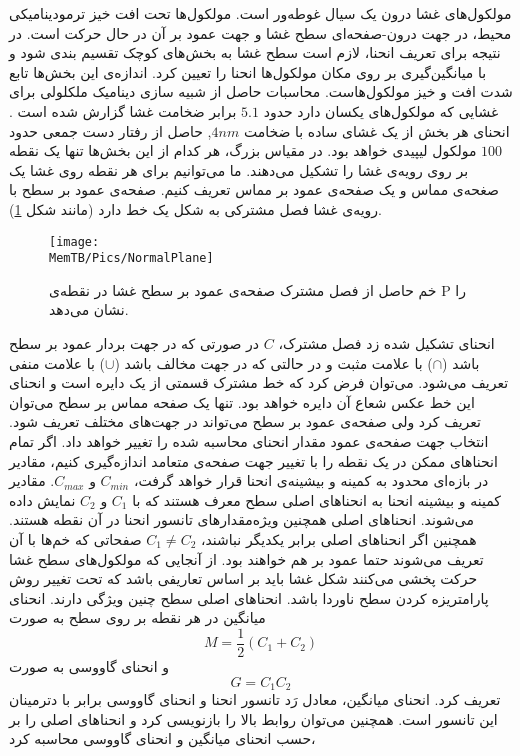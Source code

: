 مولکول‌های غشا درون یک سیال غوطه‌ور است. مولکول‌ها تحت افت خیز ترمودینامیکی محیط، در جهت‌ درون-صفحه‌ای سطح غشا و جهت عمود بر آن در حال حرکت است. در نتیجه برای تعریف انحنا، لازم است  سطح غشا به بخش‌های کوچک تقسیم بندی شود و با میانگین‌گیری بر روی  مکان مولکول‌ها انحنا را تعیین کرد. اندازه‌ی این بخش‌ها تابع شدت افت و خیز مولکول‌هاست. محاسبات حاصل از  شبیه‌ سازی دینامیک ملکلولی برای غشایی که مولکول‌های یکسان دارد حدود
$5.1$ 
 برابر ضخامت غشا گزارش شده است
\cite{Goetz1998}.
 انحنای هر بخش از یک غشای ساده با ضخامت 
$4nm$,
 حاصل از رفتار دست جمعی حدود 
$100$
مولکول لیپیدی خواهد بود. در مقیاس بزرگ، هر کدام از این بخش‌ها تنها یک نقطه بر روی رویه‌ی غشا را تشکیل می‌دهند. ما می‌توانیم برای هر نقطه روی غشا یک صغحه‌ی مماس و یک صفحه‌ی عمود بر مماس تعریف کنیم. صفحه‌ی عمود بر سطح با رویه‌ی غشا فصل مشترکی به شکل یک خط دارد (مانند شکل 
\ref{fig:normalPlaneIntersection}).
\begin{figure}[h]
\begin{center}
\texttt{[image: \\MemTB/Pics/NormalPlane]}
\caption{
خم حاصل از فصل مشترک صفحه‌ی عمود بر سطح غشا در نقطه‌ی 
P
را نشان می‌دهد.
}
\label{fig:normalPlaneIntersection}
\end{center}
\end{figure}
انحنای تشکیل شده زد فصل مشترک، 
$C$
 در صورتی که در جهت بردار عمود بر سطح باشد 
($\cap$)
 با علامت مثبت و در حالتی که در جهت مخالف باشد 
($\cup$)
 با علامت منفی تعریف می‌شود. می‌توان فرض کرد که خط مشترک قسمتی از یک دایره  است و انحنای این خط عکس شعاع آن دایره خواهد بود. تنها یک  صفحه‌ مماس بر سطح  می‌توان تعریف کرد ولی صفحه‌ی عمود بر سطح می‌تواند در جهت‌های مختلف تعریف شود. انتخاب جهت صفحه‌ی عمود مقدار انحنای محاسبه شده را تغییر خواهد داد. اگر تمام انحناهای ممکن در یک نقطه‌ را با تغییر جهت صفحه‌ی متعامد اندازه‌گیری کنیم، مقادیر در بازه‌ای محدود به  کمینه و بیشینه‌ی انحنا قرار خواهد گرفت،
$C_{min}$
و
$C_{max}$.
 مقادیر کمینه و بیشینه انحنا به انحناهای اصلی سطح معرف هستند که با 
$C_1$
و
$C_2$
نمایش داده می‌شوند. انحناهای اصلی همچنین  ویژه‌مقدار‌های تانسور انحنا در آن نقطه هستند. همچنین اگر انحناهای اصلی برابر یکدیگر نباشند،
$C_1\neq C_2$ 
صفحاتی که خم‌ها با آن تعریف می‌شوند حتما عمود بر هم خواهند بود. از آنجایی که مولکول‌های سطح غشا حرکت پخشی می‌کنند  شکل غشا باید بر اساس تعاریفی باشد که تحت تغییر روش پارامتریزه  
 کردن سطح ناوردا باشد. انحناهای اصلی سطح چنین ویژگی دارند. انحنای میانگین در هر نقطه‌ بر روی سطح به صورت 
\begin{equation}
M=\frac{1}{2}(C_1+C_2)
\label{eq:meanCurv}
\end{equation}
و انحنای گاووسی به صورت
\begin{equation}
G=C_1C_2
\label{eq:gaussianCurv}
\end{equation}
 تعریف کرد. انحنای میانگین، معادل رَد 
 تانسور انحنا و انحنای گاووسی برابر با دترمینان این تانسور است. همچنین می‌توان روابط بالا را بازنویسی کرد و انحناهای اصلی را بر حسب انحنای میانگین و انحنای گاووسی محاسبه کرد،

